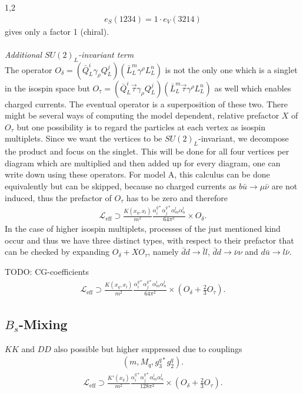 \documentclass[11pt,a4paper,twoside]{article}
\numberwithin{equation}{section}
\begin{document}
\begin{spacing}{1,2}
\cite{Fierz}
\begin{align}
 e_S(1234) = 1\cdot e_V(3214)
\end{align}
gives only a factor 1 (chiral).
\\ \\ \noindent \textit{Additional $SU(2)_L$-invariant term}\\
\noindent The operator $O_\delta=\left(\bar Q_L^i \gamma_\rho Q_L^j\right)\left(\bar L_L^m \gamma^\rho L_L^n\right)$ is not the only one which is a singlet
in the isospin space but $O_\tau=\left(\bar Q_L^i\vec \tau \gamma_\rho Q_L^j\right)\left(\bar L_L^m\vec \tau \gamma^\rho L_L^n\right)$ as well which enables
charged currents. The eventual operator is a superposition of these two. There might be several ways of computing the model dependent, relative 
prefactor $X$ of $O_\tau$  but one possibility is to regard the particles at each vertex as isospin multiplets. Since we want the vertices to be 
$SU(2)_L$-invariant, we 
decompose the product and focus on the singlet. This will be done for all four vertices per diagram which are multiplied and then added up for every diagram,
one can write down using these operators. For model A, this calculus can be done equivalently but can be skipped, because no charged currents as 
$b \bar u \rightarrow \mu \bar \nu$ are not induced, thus the prefactor of $O_\tau$ has to be zero and therefore 
\begin{align}
  \mathcal{L}_\text{eff} \supset \frac{K(x_q,x_l)}{m^2}\frac{\alpha_i^{q*} \alpha_j^{q*} \alpha_m^l \alpha_n^l}{64\pi^2} \times O_\delta.
 \label{eq_LagBSmumuModA}
\end{align}
In the case of higher isospin multiplets, processes of the just mentioned kind occur and thus we have three distinct types, with respect to their prefactor
that can be checked by expanding $O_\delta + X O_\tau$, namely $\bar d d\rightarrow \bar l l$, $\bar d d \rightarrow \bar\nu \nu$ and 
$d \bar u\rightarrow l\bar\nu$. 


TODO: CG-coefficients
\begin{align}
 \mathcal{L}_\text{eff} \supset \frac{K(x_q,x_l)}{m^2}\frac{\alpha_i^{q*} \alpha_j^{q*} \alpha_m^l \alpha_n^l}{64\pi^2}\times\left(O_\delta + \frac23 O_\tau\right).
 \label{eq_LagBSmumuModB}
\end{align}




\subsection{$B_s$-Mixing}
$KK$ and $DD$ also possible but higher suppressed due to couplings
\begin{align}
 \left(m, M_q, g_3^{q*}g_2^q\right).
\end{align}
\begin{align}
 \mathcal{L}_\text{eff} \supset \frac{K'(x_q)}{m^2}\frac{\alpha_i^{q*} \alpha_j^{q*} \alpha_m^l \alpha_n^l}{128\pi^2}\times\left(O_\delta + \frac23 O_\tau\right).
 \label{eq_LagBSmixModB}
\end{align}



\end{spacing}
\end{document}
